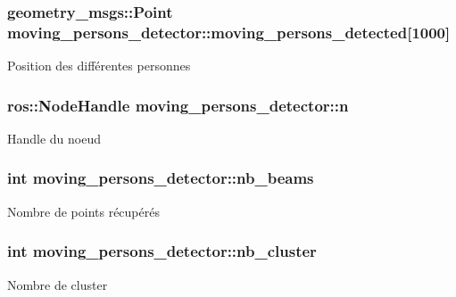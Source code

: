 \subsubsection[{\texorpdfstring{moving\+\_\+persons\+\_\+detected}{moving_persons_detected}}]{\setlength{\rightskip}{0pt plus 5cm}geometry\+\_\+msgs\+::\+Point moving\+\_\+persons\+\_\+detector\+::moving\+\_\+persons\+\_\+detected\mbox{[}1000\mbox{]}\hspace{0.3cm}{\ttfamily [private]}}\hypertarget{classmoving__persons__detector_a20d0b31be1b975603b3967e8de6da662}{}\label{classmoving__persons__detector_a20d0b31be1b975603b3967e8de6da662}
Position des différentes personnes 
\subsubsection[{\texorpdfstring{n}{n}}]{\setlength{\rightskip}{0pt plus 5cm}ros\+::\+Node\+Handle moving\+\_\+persons\+\_\+detector\+::n\hspace{0.3cm}{\ttfamily [private]}}\hypertarget{classmoving__persons__detector_ac7ce090922b1fbb39792fe80249c2ac7}{}\label{classmoving__persons__detector_ac7ce090922b1fbb39792fe80249c2ac7}
Handle du noeud 
\subsubsection[{\texorpdfstring{nb\+\_\+beams}{nb_beams}}]{\setlength{\rightskip}{0pt plus 5cm}int moving\+\_\+persons\+\_\+detector\+::nb\+\_\+beams\hspace{0.3cm}{\ttfamily [private]}}\hypertarget{classmoving__persons__detector_ad6c97c267707ec5b67e3295899ccb40d}{}\label{classmoving__persons__detector_ad6c97c267707ec5b67e3295899ccb40d}
Nombre de points récupérés 
\subsubsection[{\texorpdfstring{nb\+\_\+cluster}{nb_cluster}}]{\setlength{\rightskip}{0pt plus 5cm}int moving\+\_\+persons\+\_\+detector\+::nb\+\_\+cluster\hspace{0.3cm}{\ttfamily [private]}}\hypertarget{classmoving__persons__detector_a62bb0f7e285afa97978df71473259d58}{}\label{classmoving__persons__detector_a62bb0f7e285afa97978df71473259d58}
Nombre de cluster 
